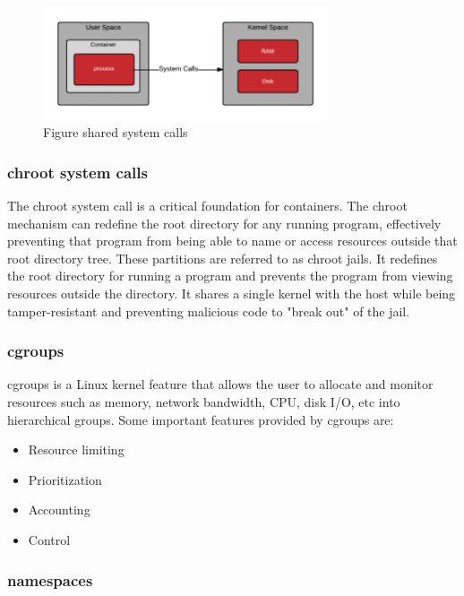 \documentclass[american]{article}
\begin{document}
\begin{figure}[h]
    \centering
    \includegraphics[width=0.75\textwidth]{system-calls}
    \caption{Figure shared system calls}
    \label{fig:sys-calls}
\end{figure}


\subsubsection{chroot system calls}
The chroot system call is a critical foundation for containers.  The chroot mechanism can redefine the root directory for any running program, effectively preventing that program from being able to name or access resources outside that root directory tree. These partitions are referred to as chroot jails\cite{intel-whitepaper}. It redefines the root directory for running a program and prevents the program from viewing resources outside the directory. It shares a single kernel with the host while being tamper-resistant and preventing malicious code to "break out" of the jail.


\subsubsection{cgroups}

cgroups is a Linux kernel feature that allows the user to allocate and monitor resources such as memory, network bandwidth, CPU, disk I/O, etc into hierarchical groups\cite{cgroups-wiki}. Some important features provided by cgroups are\cite{cgroups}:
\begin{itemize}
	\item Resource limiting
	\item Prioritization
	\item Accounting
	\item Control
\end{itemize}

\subsubsection{namespaces}
\end{document}
